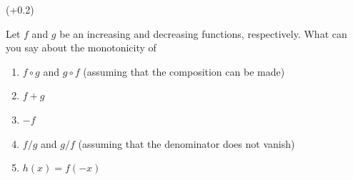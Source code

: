\documentclass[9pt]{beamer}
\begin{document}
\begin{frame}{ (+0.2)}

        Let $f$ and $g$ be an increasing and decreasing functions, respectively. What can you say about the monotonicity of
            
        \begin{enumerate}[leftmargin = 0.5cm, label = (\alph*), rightmargin = 0.2cm]
            \item $f\circ g$ and $g\circ f$ (assuming that the composition can be made) 

            \item $f + g$

            \item $-f$

            \item $f/g$ and $g/f$ (assuming that the denominator does not vanish)

            \item $h(x) = f(-x)$
        \end{enumerate}
    
\end{frame}





\end{document}
